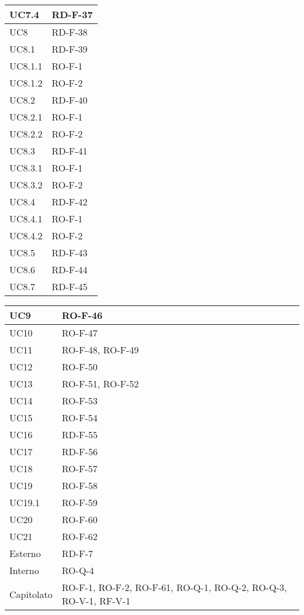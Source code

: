\begin{center}
\begin{tabular}{ |m{8em}|m{13em}| }
    \hline
    UC7.4       &   RD-F-37 \\
    \hline
    UC8         &   RD-F-38 \\
    \hline
    UC8.1       &   RD-F-39 \\
    \hline
    UC8.1.1     &   RO-F-1 \\
    \hline
    UC8.1.2     &   RO-F-2 \\
    \hline
    UC8.2       &   RD-F-40 \\
    \hline
    UC8.2.1     &   RO-F-1 \\
    \hline
    UC8.2.2     &   RO-F-2 \\
    \hline
    UC8.3       &   RD-F-41 \\
    \hline
    UC8.3.1     &   RO-F-1 \\
    \hline
    UC8.3.2     &   RO-F-2 \\
    \hline
    UC8.4       &   RD-F-42 \\
    \hline
    UC8.4.1     &   RO-F-1 \\
    \hline
    UC8.4.2     &   RO-F-2 \\
    \hline
    UC8.5       &   RD-F-43 \\
    \hline
    UC8.6       &   RD-F-44 \\
    \hline
    UC8.7       &   RD-F-45 \\
    \hline
    \end{tabular}
    \newpage
    \begin{tabular}{ |m{8em}|m{13em}| }
    \hline
    UC9         &   RO-F-46 \\
    \hline
    UC10        &   RO-F-47 \\
    \hline
    UC11        &   RO-F-48, RO-F-49 \\
    \hline
    UC12        &   RO-F-50 \\
    \hline
    UC13        &   RO-F-51, RO-F-52 \\
    \hline
    UC14        &   RO-F-53 \\
    \hline
    UC15        &   RO-F-54 \\
    \hline
    UC16        &   RD-F-55 \\
    \hline
    UC17        &   RD-F-56 \\
    \hline
    UC18        &   RO-F-57 \\
    \hline
    UC19        &   RO-F-58 \\
    \hline
    UC19.1      &   RO-F-59 \\
    \hline
    UC20        &   RO-F-60 \\
    \hline
    UC21        &   RO-F-62 \\
    \hline
    Esterno     &   RD-F-7 \\
    \hline
    Interno     &   RO-Q-4 \\
    \hline
    Capitolato  &   RO-F-1, RO-F-2, RO-F-61, RO-Q-1, RO-Q-2, RO-Q-3, RO-V-1, RF-V-1 \\
    \hline
\end{tabular}
\end{center}
